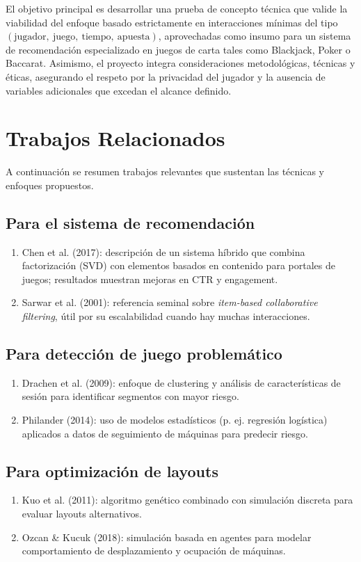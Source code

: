 \documentclass[12pt,a4paper]{article}
\begin{document}
El objetivo principal es desarrollar una prueba de concepto técnica que valide la viabilidad del enfoque basado estrictamente en interacciones mínimas del tipo \((\text{jugador},\ \text{juego},\ \text{tiempo},\ \text{apuesta})\), aprovechadas como insumo para un sistema de recomendación especializado en juegos de carta tales como Blackjack, Poker o Baccarat. Asimismo, el proyecto integra consideraciones metodológicas, técnicas y éticas, asegurando el respeto por la privacidad del jugador y la ausencia de variables adicionales que excedan el alcance definido.

\section{Trabajos Relacionados}
A continuación se resumen trabajos relevantes que sustentan las técnicas y enfoques propuestos.

\subsection{Para el sistema de recomendación}
\begin{enumerate}[leftmargin=*]
    \item Chen et al. (2017): descripción de un sistema híbrido que combina factorización (SVD) con elementos basados en contenido para portales de juegos; resultados muestran mejoras en CTR y engagement.
    \item Sarwar et al. (2001): referencia seminal sobre \emph{item-based collaborative filtering}, útil por su escalabilidad cuando hay muchas interacciones.
\end{enumerate}

\subsection{Para detección de juego problemático}
\begin{enumerate}[leftmargin=*]
    \item Drachen et al. (2009): enfoque de clustering y análisis de características de sesión para identificar segmentos con mayor riesgo.
    \item Philander (2014): uso de modelos estadísticos (p. ej. regresión logística) aplicados a datos de seguimiento de máquinas para predecir riesgo.
\end{enumerate}

\subsection{Para optimización de layouts}
\begin{enumerate}[leftmargin=*]
    \item Kuo et al. (2011): algoritmo genético combinado con simulación discreta para evaluar layouts alternativos.
    \item Ozcan \& Kucuk (2018): simulación basada en agentes para modelar comportamiento de desplazamiento y ocupación de máquinas.
\end{enumerate}
\end{document}
